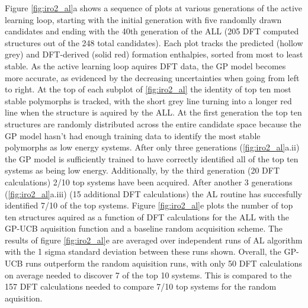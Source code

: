 %
Figure \ref{fig:iro2_al}a shows a sequence of plots at various generations of the active learning loop,
starting with the initial generation with five randomlly drawn candidates and ending with the 40th generation of the ALL
(205  DFT computed structures out of the 248 total candidates).
%
Each plot tracks the predicted (hollow grey) and DFT-derived (solid red) formation enthalpies, sorted from most to least stable.
%
As the active learning loop aquires DFT data, the GP model becomes more accurate, as evidenced by the decreasing uncertainties when going from left to right.
%
At the top of each subplot of \ref{fig:iro2_al} the identity of top ten most stable polymorphs is tracked,
with the short grey line turning into a longer red line when the structure is aquired by the ALL.
%
At the first generation the top ten structures are randomly distributed across the entire candidate space because the GP model hasn't had enough training data to identify the most stable polymorphs as low energy systems.
%
After only three generations (\ref{fig:iro2_al}a.ii) the GP model is sufficiently trained to have correctly identified all of the top ten systems as being low energy.
%
Additionally, by the third generation (20 DFT calculations) 2/10 top systems have been acquired.
%
After another 3 generations (\ref{fig:iro2_al}a.iii) (15 additional DFT calculations) the AL routine has succesfully identified 7/10 of the top systems.
%
Figure \ref{fig:iro2_al}e plots the number of top ten structures aquired as a function of DFT calculations for the ALL with the GP-UCB aquisition function and a baseline random acquisition scheme.
%
The results of figure \ref{fig:iro2_al}e are averaged over independent runs of AL algorithm with the 1 sigma standard deviation between these runs shown.
%
Overall, the GP-UCB runs outperform the random aquisition runs, with only 50 DFT calculations on average needed to discover 7 of the top 10 systems.
%
This is compared to the 157 DFT calculations needed to compare 7/10 top systems for the random aquisition.

